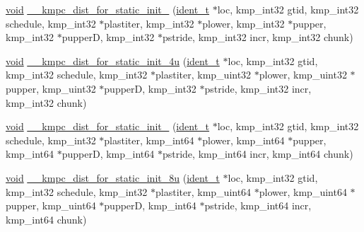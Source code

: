\begin{DoxyCompactItemize}
\item 
\hyperlink{ittnotify__static_8h_af941d56e55e3c5465135b60c4d6343ed}{void} \hyperlink{group__WORK__SHARING_gab1acaeaf1525bb1d998ba2110c268b24}{\-\_\-\-\_\-kmpc\-\_\-dist\-\_\-for\-\_\-static\-\_\-init\-\_} (\hyperlink{group__BASIC__TYPES_ga690fda6b92f039a72db263c6b4394ddb}{ident\-\_\-t} $\ast$loc, kmp\-\_\-int32 gtid, kmp\-\_\-int32 schedule, kmp\-\_\-int32 $\ast$plastiter, kmp\-\_\-int32 $\ast$plower, kmp\-\_\-int32 $\ast$pupper, kmp\-\_\-int32 $\ast$pupper\-D, kmp\-\_\-int32 $\ast$pstride, kmp\-\_\-int32 incr, kmp\-\_\-int32 chunk)
\item 
\hyperlink{ittnotify__static_8h_af941d56e55e3c5465135b60c4d6343ed}{void} \hyperlink{group__WORK__SHARING_ga7054a4ec6bf4a65dda00a0aab75db65f}{\-\_\-\-\_\-kmpc\-\_\-dist\-\_\-for\-\_\-static\-\_\-init\-\_\-4u} (\hyperlink{group__BASIC__TYPES_ga690fda6b92f039a72db263c6b4394ddb}{ident\-\_\-t} $\ast$loc, kmp\-\_\-int32 gtid, kmp\-\_\-int32 schedule, kmp\-\_\-int32 $\ast$plastiter, kmp\-\_\-uint32 $\ast$plower, kmp\-\_\-uint32 $\ast$pupper, kmp\-\_\-uint32 $\ast$pupper\-D, kmp\-\_\-int32 $\ast$pstride, kmp\-\_\-int32 incr, kmp\-\_\-int32 chunk)
\item 
\hyperlink{ittnotify__static_8h_af941d56e55e3c5465135b60c4d6343ed}{void} \hyperlink{group__WORK__SHARING_ga21ff57e990e07b43d08dfb4214d928c8}{\-\_\-\-\_\-kmpc\-\_\-dist\-\_\-for\-\_\-static\-\_\-init\-\_} (\hyperlink{group__BASIC__TYPES_ga690fda6b92f039a72db263c6b4394ddb}{ident\-\_\-t} $\ast$loc, kmp\-\_\-int32 gtid, kmp\-\_\-int32 schedule, kmp\-\_\-int32 $\ast$plastiter, kmp\-\_\-int64 $\ast$plower, kmp\-\_\-int64 $\ast$pupper, kmp\-\_\-int64 $\ast$pupper\-D, kmp\-\_\-int64 $\ast$pstride, kmp\-\_\-int64 incr, kmp\-\_\-int64 chunk)
\item 
\hyperlink{ittnotify__static_8h_af941d56e55e3c5465135b60c4d6343ed}{void} \hyperlink{group__WORK__SHARING_gac7d4d8d2d7f5d33b5c2b33d89b3ec0af}{\-\_\-\-\_\-kmpc\-\_\-dist\-\_\-for\-\_\-static\-\_\-init\-\_\-8u} (\hyperlink{group__BASIC__TYPES_ga690fda6b92f039a72db263c6b4394ddb}{ident\-\_\-t} $\ast$loc, kmp\-\_\-int32 gtid, kmp\-\_\-int32 schedule, kmp\-\_\-int32 $\ast$plastiter, kmp\-\_\-uint64 $\ast$plower, kmp\-\_\-uint64 $\ast$pupper, kmp\-\_\-uint64 $\ast$pupper\-D, kmp\-\_\-int64 $\ast$pstride, kmp\-\_\-int64 incr, kmp\-\_\-int64 chunk)
\end{DoxyCompactItemize}
